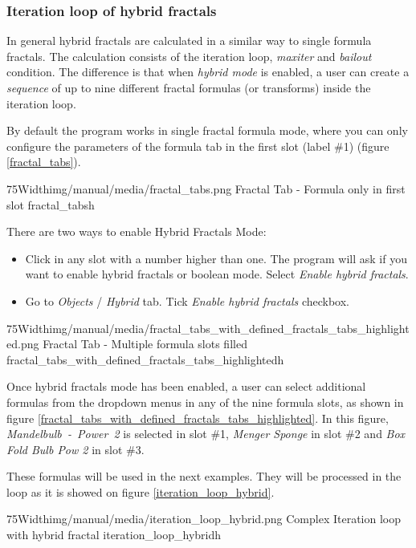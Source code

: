 \subsubsection{Iteration loop of hybrid fractals}

In general hybrid fractals are calculated in a similar way to single formula fractals.
The calculation consists of the iteration loop, \emph{maxiter} and \emph{bailout} condition. The
difference is that when \emph{hybrid mode} is enabled, a user can create a \emph{sequence} of up to nine different fractal formulas (or transforms) inside the iteration loop. 

By default the program works in single fractal formula mode, where you can only configure the parameters of the formula tab in the first slot (label \#1) (figure \ref{fractal_tabs}).

\simpleImageWithCaption75Width{img/manual/media/fractal_tabs.png}
{Fractal Tab - Formula only in first slot}
{fractal_tabs}{h}

There are two ways to enable Hybrid Fractals Mode:
\begin{itemize}
	\item Click in any slot with a number higher than one. The program will ask if you want to
	enable hybrid fractals or boolean mode. Select \emph{Enable hybrid fractals}.
	\item Go to \emph{Objects} / \emph{Hybrid} tab. Tick \emph{Enable hybrid fractals} checkbox.
\end{itemize}

\simpleImageWithCaption75Width{img/manual/media/fractal_tabs_with_defined_fractals_tabs_highlighted.png}
{Fractal Tab - Multiple formula slots filled}
{fractal_tabs_with_defined_fractals_tabs_highlighted}{h}

Once hybrid fractals mode has been enabled, a user can select additional formulas from the dropdown menus in any of the nine formula slots,
as shown in figure \ref{fractal_tabs_with_defined_fractals_tabs_highlighted}.
In this figure, \emph{Mandelbulb~-~Power~2} is selected in slot \#1, \emph{Menger Sponge}
in slot \#2 and \emph{Box Fold Bulb Pow 2} in slot \#3.

These formulas will be
used in the next examples. They will be processed in the loop as it is showed on figure \ref{iteration_loop_hybrid}.

\simpleImageWithCaption75Width{img/manual/media/iteration_loop_hybrid.png}
{Complex Iteration loop with hybrid fractal}
{iteration_loop_hybrid}{h}

